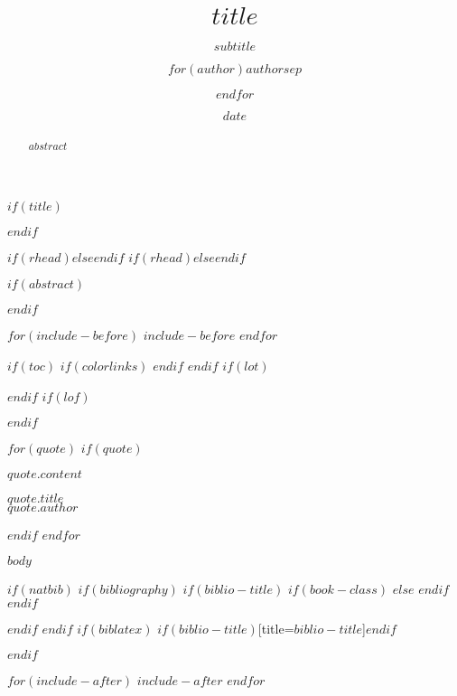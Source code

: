 \documentclass[$if(fontsize)$$fontsize$,$endif$$if(lang)$$babel-lang$,$endif$$if(papersize)$$papersize$paper,$endif$$for(classoption)$$classoption$$sep$,$endfor$nols, notitlepage, notoc]{tufte-handout}
\title{$title$}
\subtitle{$subtitle$}
\author{$for(author)$$author$$sep$ \and $endfor$}
\date{$date$}
\date{}
\begin{document}
$if(title)$
\maketitle
$endif$

\setlength{\epigraphwidth}{1.15\textwidth}


\pagestyle{fancy}
$if(rhead)$$else$\rhead{\footnotesize \thepage\ | \pageref{LastPage}}$endif$
{
  \fancyhf{}
  $if(rhead)$$else$\rhead{\footnotesize \thepage\ | \pageref{LastPage}}$endif$
  \renewcommand{\headrulewidth}{0pt}
}
\thispagestyle{firststyle}



$if(abstract)$
\begin{abstract}
\noindent $abstract$
\end{abstract}
$endif$

$for(include-before)$
$include-before$
$endfor$

$if(toc)$
{
$if(colorlinks)$
\hypersetup{linkcolor=$if(toccolor)$$toccolor$$else$black$endif$}
$endif$
\setcounter{tocdepth}{$toc-depth$}
\tableofcontents
}
$endif$
$if(lot)$
\listoftables
$endif$
$if(lof)$
\listoffigures
$endif$

$for(quote)$
$if(quote)$
\bigskip
\epigraph{$quote.content$}{$quote.title$\\\textsc{$quote.author$}}
\smallskip
$endif$
$endfor$


$body$

$if(natbib)$
$if(bibliography)$
$if(biblio-title)$
$if(book-class)$
\renewcommand\bibname{$biblio-title$}
$else$
\renewcommand\refname{$biblio-title$}
$endif$
$endif$


$endif$
$endif$
$if(biblatex)$
\printbibliography$if(biblio-title)$[title=$biblio-title$]$endif$

$endif$

$for(include-after)$
$include-after$
$endfor$
\end{document}
